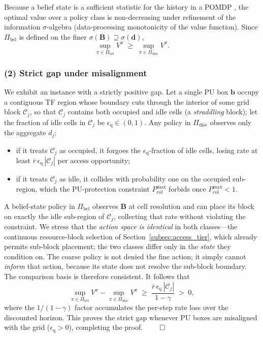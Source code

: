 \documentclass[journal]{IEEEtran}
\newcommand{\boxk}{\bm{b}}                 %
\newcommand{\belmap}{\bm{B}}               %
\newcommand{\pol}{\pi}                     %
\newcommand{\disc}{\gamma}                 %
\newcommand{\Vfun}{V}                      %
\newcommand{\Pcolmax}{P_{\mathrm{col}}^{\max}} %
\newcommand{\PIbel}{\Pi_{\mathrm{bel}}}    %
\newcommand{\PIdis}{\Pi_{\mathrm{disc}}}   %
\newcommand{\quanterr}{\epsilon_{\mathrm{q}}} %
\begin{document}
Because a belief state is a sufficient statistic for the history in a POMDP
\cite{kaelbling1998planning}, the optimal value over a policy class is
non-decreasing under refinement of the information $\sigma$-algebra
(data-processing monotonicity of the value function). Since $\PIbel$ is
defined on the finer $\sigma(\belmap)\supseteq\sigma(\bm{d})$,
\begin{equation}
\sup_{\pol\in\PIbel}\Vfun^{\pol}
\;\ge\;
\sup_{\pol\in\PIdis}\Vfun^{\pol}.
\label{eq:appB_monotone}
\end{equation}

\subsubsection*{(2) Strict gap under misalignment}
We exhibit an instance with a strictly positive gap. Let a single PU box
$\boxk$ occupy a contiguous TF region whose boundary cuts through the
interior of some grid block $\mathcal{C}_j$, so that $\mathcal{C}_j$ contains
both occupied and idle cells (a \emph{straddling} block); let the
fraction of idle cells in $\mathcal{C}_j$ be $\quanterr\in(0,1)$. Any policy
in $\PIdis$ observes only the aggregate $d_j$:
\begin{itemize}
\item if it treats $\mathcal{C}_j$ as occupied, it forgoes the
$\quanterr$-fraction of idle cells, losing rate at least
$\bar r\,\quanterr\,|\mathcal{C}_j|$ per access opportunity;
\item if it treats $\mathcal{C}_j$ as idle, it collides with probability one
on the occupied sub-region, which the PU-protection constraint
$\Pcolmax$ forbids once $\Pcolmax<1$.
\end{itemize}
A belief-state policy in $\PIbel$ observes $\belmap$ at cell resolution and
can place its block on exactly the idle sub-region of $\mathcal{C}_j$,
collecting that rate without violating the constraint. We stress that the
\emph{action space is identical} in both classes---the continuous
resource-block selection of Section~\ref{subsec:access_tier}, which already
permits sub-block placement; the two classes differ only in the
\emph{state} they condition on. The coarse policy is not denied the fine
action; it simply cannot \emph{inform} that action, because its state does
not resolve the sub-block boundary. The comparison basis is therefore
consistent. It follows that
\begin{equation}
\sup_{\pol\in\PIbel}\Vfun^{\pol}-\sup_{\pol\in\PIdis}\Vfun^{\pol}
\;\ge\;
\frac{\bar r\,\quanterr\,|\mathcal{C}_j|}{1-\disc}\;>\;0,
\label{eq:appB_gap}
\end{equation}
where the $1/(1-\disc)$ factor accumulates the per-step rate loss over the
discounted horizon. This proves the strict gap whenever PU boxes are
misaligned with the grid ($\quanterr>0$), completing the proof. \hfill$\qed$
\end{document}
